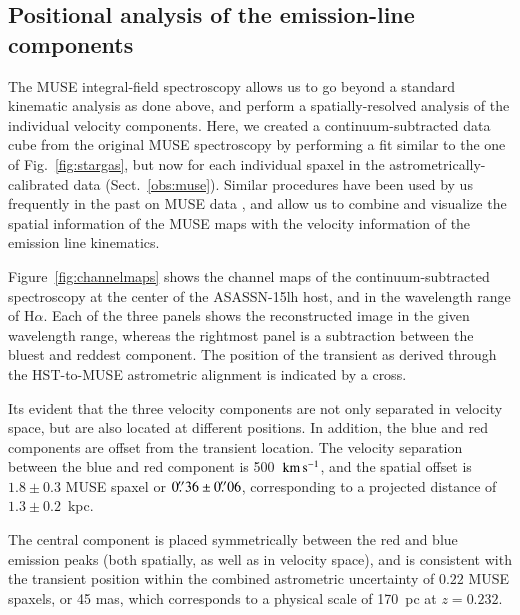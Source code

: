 \documentclass[traditabstract]{aa}
\newcommand{\farc}{\hbox{$.\!\!^{\prime\prime}$}}
\newcommand{\kms}{$\rm{km\,s^{-1}}$}
\newcommand{\ha}{H$\alpha$}
\begin{document}
\subsection{Positional analysis of the emission-line components}
\label{sec:posana}

The MUSE integral-field spectroscopy allows us to go beyond a standard kinematic analysis as done above, and perform a spatially-resolved analysis of the individual velocity components. Here, we created a continuum-subtracted data cube from the original MUSE spectroscopy by performing a fit similar to the one of Fig.~\ref{fig:stargas}, but now for each individual spaxel in the astrometrically-calibrated data (Sect.~\ref{obs:muse}). Similar procedures have been used by us frequently in the past on MUSE data \citep{2016MNRAS.455.4087G, 2016ApJ...830L..32P, 2017arXiv170205430K}, and allow us to combine and visualize the spatial information of the MUSE maps with the velocity information of the emission line kinematics.

Figure~\ref{fig:channelmaps} shows the channel maps of the continuum-subtracted spectroscopy at the center of the ASASSN-15lh host, and in the wavelength range of \ha. Each of the three panels shows the reconstructed image in the given wavelength range, whereas the rightmost panel is a subtraction between the bluest and reddest component. The position of the transient as derived through the HST-to-MUSE astrometric alignment is indicated by a cross.

Its evident that the three velocity components are not only separated in velocity space, but are also located at different positions. In addition, the blue and red components are offset from the transient location. The velocity separation between the blue and red component is 500~\kms, and the spatial offset is $1.8\pm0.3$ MUSE spaxel or $0\farc{36}\pm0\farc{06}$, corresponding to a projected distance of $1.3\pm0.2$~kpc. 

The central component is placed symmetrically between the red and blue emission peaks (both spatially, as well as in velocity space), and is consistent with the transient position within the combined astrometric uncertainty of $0.22$ MUSE spaxels, or 45 mas, which corresponds to a physical scale of 170~pc at $z=0.232$.
\end{document}
